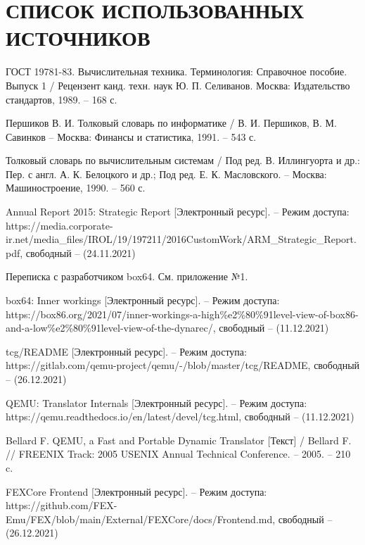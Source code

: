 \section*{СПИСОК ИСПОЛЬЗОВАННЫХ ИСТОЧНИКОВ}

\begingroup
\renewcommand{\section}[2]{}
\begin{thebibliography}{}
	ГОСТ 19781-83. Вычислительная техника. Терминология: Справочное пособие. Выпуск 1 / Рецензент канд. техн. наук Ю. П. Селиванов. Москва: Издательство стандартов, 1989. -- 168 с.
		 
	Першиков В. И. Толковый словарь по информатике / В. И. Першиков, В. М. Савинков -- Москва: Финансы и статистика, 1991. -- 543 с.
	
	Толковый словарь по вычислительным системам / Под ред. В. Иллингуорта и др.: Пер. с англ. А. К. Белоцкого и др.; Под ред. Е. К. Масловского. -- Москва: Машиностроение, 1990. -- 560 с.
	
	Annual Report 2015: Strategic Report [Электронный ресурс]. -- Режим доступа: https://media.corporate-ir.net/media\_files/IROL/19/197211/2016CustomWork/ARM\_Strategic\_Report.pdf,
	свободный -- (24.11.2021)
	
	Переписка с разработчиком box64. См. приложение №1.
	
	box64: Inner workings [Электронный ресурс]. -- Режим доступа: https://box86.org/2021/07/inner-workings-a-high\%e2\%80\%91level-view-of-box86-and-a-low\%e2\%80\%91level-view-of-the-dynarec/,
	свободный -- (11.12.2021)
	
	tcg/README  [Электронный ресурс]. -- Режим доступа: https://gitlab.com/qemu-project/qemu/-/blob/master/tcg/README,
	свободный -- (26.12.2021)
	
	QEMU: Translator Internals [Электронный ресурс]. -- Режим доступа: https://qemu.readthedocs.io/en/latest/devel/tcg.html,
	свободный -- (11.12.2021)
	
	Bellard F. QEMU, a Fast and Portable Dynamic Translator [Текст]  / Bellard F. // FREENIX Track: 2005 USENIX Annual Technical Conference. -- 2005. -- 210 c.

FEXCore Frontend [Электронный ресурс]. -- Режим доступа: 	https://github.com/FEX-Emu/FEX/blob/main/External/FEXCore/docs/Frontend.md,
свободный -- (26.12.2021)	


\end{thebibliography}
